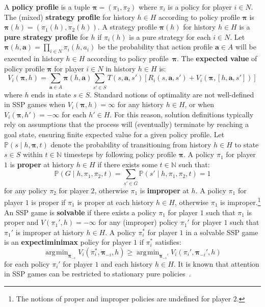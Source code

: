 \documentclass[10pt]{article}
\theoremstyle{plain}
\newcommand{\vect}[1]{\bm{#1}}
\DeclareMathOperator*{\argmin}{\arg\!\min}
\begin{document}
A \textbf{policy profile} is a tuple $\vect{\pi} = \left( \pi_{1}, \pi_{2} \right)$ where $\pi_{i}$ is a policy for player $i \in N$.
The (mixed) \textbf{strategy profile} for history $h \in H$ according to policy profile $\vect{\pi}$ is $\vect{\pi}(h) = \left( \pi_{1}(h), \pi_{2}(h) \right)$.
A strategy profile $\vect{\pi}(h)$ for history $h \in H$ is a \textbf{pure strategy profile} for $h$ if $\pi_{i}(h)$ is a pure strategy for each $i \in N$.
Let $\vect{\pi}(h, \vect{a}) = \prod_{i \in N} \pi_{i}(h, a_{i})$ be the probability that action profile $\vect{a} \in A$ will be executed in history $h \in H$ according to policy profile~$\vect{\pi}$.
The \textbf{expected value} of policy profile $\vect{\pi}$ for player $i \in N$ in history $h \in H$ is:
\begin{equation}
    V_{i}(\vect{\pi}, h) = \sum_{\vect{a} \in A} \vect{\pi}(h, \vect{a}) \sum_{s' \in S} T(s, \vect{a}, s') \left[ R_{i}(s, \vect{a}, s') + V_{i}(\vect{\pi}, [h, \vect{a}, s']) \right]
\end{equation}
where $h$ ends in state $s \in S$.
Standard notions of optimality are not well-defined in SSP games when $V_{i}(\vect{\pi}, h) = \infty$ for any history $h \in H$, or when $V_{i}(\vect{\pi}, h') = -\infty$ for each $h' \in H$.
For this reason, solution definitions typically rely on assumptions that the process will (eventually) terminate by reaching a goal state, ensuring finite expected value for a given policy profile.
Let $\mathbb{P}(s \mid h, \vect{\pi}, t)$ denote the probability of transitioning from history $h \in H$ to state $s \in S$ within $t \in \mathbb{N}$ timesteps by following policy profile $\vect{\pi}$.
A policy $\pi_{1}$ for player $1$ is \textbf{proper} at history $h \in H$ if there exists some $t \in \mathbb{N}$ such that:
\begin{equation}
    \mathbb{P}(G \mid h, \pi_{1}, \pi_{2}, t) = \sum_{s' \in G} \mathbb{P}(s' \mid h, \pi_{1}, \pi_{2}, t) = 1
\end{equation}
for any policy $\pi_{2}$ for player $2$, otherwise $\pi_{1}$ is \textbf{improper} at $h$.
A policy $\pi_{1}$ for player $1$ is proper if $\pi_{1}$ is proper at each history $h \in H$, otherwise $\pi_{1}$ is improper.\footnote{The notions of proper and improper policies are undefined for player $2$.}
An SSP game is \textbf{solvable} if
there exists a policy $\pi_{1}$ for player $1$ such that $\pi_{1}$ is proper
and $V(\pi_{1}', h) = -\infty$ for any (improper) policy $\pi_{1}'$ for player $1$ such that $\pi_{1}'$ is improper at history $h \in H$.
A policy $\pi_{i}^{*}$ for player $1$ in a solvable SSP game is an \textbf{expectiminimax} policy for player $1$ if $\pi_{i}^{*}$ satisfies:
\begin{equation}
    \argmin_{\vect{\pi}_{-i}} V_{i}(\pi_{i}^{*}, \vect{\pi}_{-i}, h) \ge \argmin_{\vect{\pi}_{-i}'} V_{i}(\pi_{i}', \vect{\pi}_{-i}', h)
\end{equation}
for each policy $\pi_{i}'$ for player $1$ and each history $h \in H$.
It is known that attention in SSP games can be restricted to stationary pure policies~\cite{}.
\end{document}
